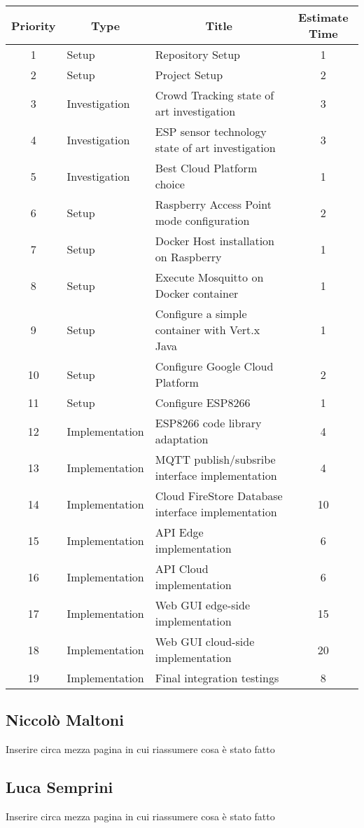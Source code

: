 \begin{table}[]
  \begin{tabular}{|c|l|l|c|}
  \hline
  \rowcolor[HTML]{CBCEFB}
  \textbf{Priority} & \multicolumn{1}{c|}{\cellcolor[HTML]{CBCEFB}\textbf{Type}} & \multicolumn{1}{c|}{\cellcolor[HTML]{CBCEFB}\textbf{Title}} & \textbf{Estimate Time} \\ \hline
  1 & Setup & Repository Setup & 1 \\ \hline
  \rowcolor[HTML]{DAE8FC}
  2 & Setup & Project Setup & 2 \\ \hline
  3 & Investigation & Crowd Tracking state of art investigation & 3 \\ \hline
  \rowcolor[HTML]{DAE8FC}
  4 & Investigation & ESP sensor technology state of art investigation & 3 \\ \hline
  5 & Investigation & Best Cloud Platform choice & 1 \\ \hline
  \rowcolor[HTML]{DAE8FC}
  6 & Setup & Raspberry Access Point mode configuration & 2 \\ \hline
  7 & Setup & Docker Host installation on Raspberry & 1 \\ \hline
  \rowcolor[HTML]{DAE8FC}
  8 & Setup & Execute Mosquitto on Docker container & 1 \\ \hline
  9 & Setup & Configure a simple container with Vert.x Java & 1 \\ \hline
  \rowcolor[HTML]{DAE8FC}
  10 & Setup & Configure Google Cloud Platform & 2 \\ \hline
  11 & Setup & Configure ESP8266 & 1 \\ \hline
  \rowcolor[HTML]{DAE8FC}
  12 & Implementation & ESP8266 code library adaptation & 4 \\ \hline
  13 & Implementation & MQTT publish/subsribe interface implementation & 4 \\ \hline
  \rowcolor[HTML]{DAE8FC}
  14 & Implementation & Cloud FireStore Database interface implementation & 10 \\ \hline
  15 & Implementation & API Edge implementation & 6 \\ \hline
  \rowcolor[HTML]{DAE8FC}
  16 & Implementation & API Cloud implementation & 6 \\ \hline
  17 & Implementation & Web GUI edge-side implementation & 15 \\ \hline
  \rowcolor[HTML]{DAE8FC}
  18 & Implementation & Web GUI cloud-side implementation & 20 \\ \hline
  19 & Implementation & Final integration testings & 8 \\ \hline
  \end{tabular}
\end{table}

\subsection{Niccolò Maltoni}

Inserire circa mezza pagina in cui riassumere cosa è stato fatto

\subsection{Luca Semprini}

Inserire circa mezza pagina in cui riassumere cosa è stato fatto
